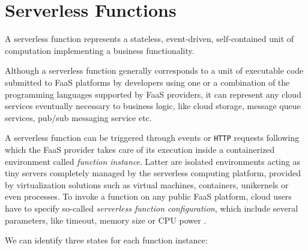 \documentclass[12pt,a4paper]{report}
\begin{document}
\section{Serverless Functions}

A serverless function represents a stateless, event-driven, self-contained unit of computation implementing a business functionality.

Although a serverless function generally corresponds to a unit of executable code submitted to FaaS platforms by developers using one or a combination of the programming languages supported by FaaS providers, it can represent any cloud services eventually necessary to business logic, like cloud storage, message queue services, pub/sub messaging service etc.

A serverless function can be triggered through events or \texttt{HTTP} requests following which the FaaS provider takes care of its execution inside a containerized environment called \textit{function instance}. Latter are isolated environments acting as tiny servers completely managed by the serverless computing platform, provided by virtualization solutions such as virtual machines, containers, unikernels or even processes. To invoke a function on any public FaaS platform, cloud users have to specify so-called \textit{serverless function configuration}, which include several parameters, like timeout, memory size or CPU power \cite{COSE}.

We can identify three states for each function instance:
\end{document}
